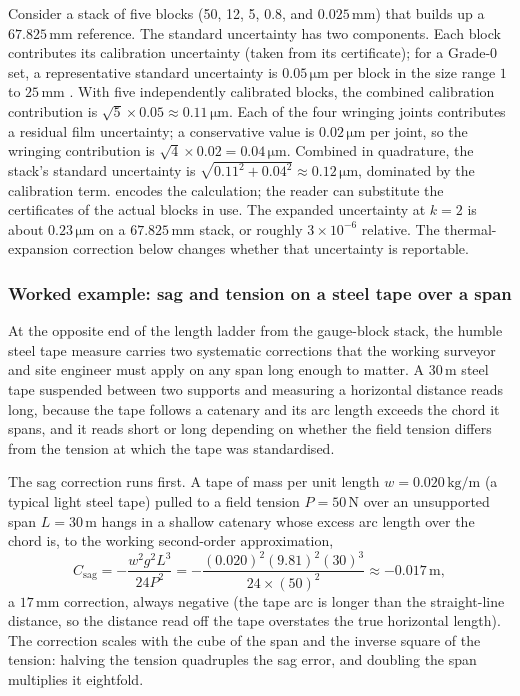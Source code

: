 Consider a stack of five blocks (50, 12, 5, 0.8, and $0.025 \,\si
{\milli\meter}$) that builds up a $67.825 \,\si{\milli\meter}$
reference. The standard uncertainty has two components. Each block
contributes its calibration uncertainty (taken from its certificate);
for a Grade-0 set, a representative standard uncertainty is
$0.05 \,\si{\micro\meter}$ per block in the size range $1$ to
$25 \,\si{\milli\meter}$ \cite{text:doiron-beers-2009}. With five
independently calibrated blocks, the combined calibration
contribution is $\sqrt{5} \times 0.05 \approx 0.11 \,\si{\micro
\meter}$. Each of the four wringing joints contributes a residual
film uncertainty; a conservative value is $0.02 \,\si{\micro\meter}$
per joint, so the wringing contribution is $\sqrt{4} \times 0.02 =
0.04 \,\si{\micro\meter}$. Combined in quadrature, the stack's
standard uncertainty is $\sqrt{0.11^{2} + 0.04^{2}} \approx 0.12 \,
\si{\micro\meter}$, dominated by the calibration term.
encodes the calculation; the reader can substitute the certificates
of the actual blocks in use. The expanded uncertainty at $k = 2$ is
about $0.23 \,\si{\micro\meter}$ on a $67.825 \,\si{\milli\meter}$
stack, or roughly $3 \times 10^{-6}$ relative. The thermal-expansion
correction below changes whether that uncertainty is reportable.

\subsubsection*{Worked example: sag and tension on a steel tape over
a span}

At the opposite end of the length ladder from the gauge-block stack,
the humble steel tape measure carries two systematic corrections that
the working surveyor and site engineer must apply on any span long
enough to matter. A $30 \,\si{\meter}$ steel tape suspended between
two supports and measuring a horizontal distance reads long, because
the tape follows a catenary and its arc length exceeds the chord it
spans, and it reads short or long depending on whether the field
tension differs from the tension at which the tape was standardised.

The sag correction runs first. A tape of mass per unit length
$w = 0.020 \,\si{\kilogram\per\meter}$ (a typical light steel tape)
pulled to a field tension $P = 50 \,\si{\newton}$ over an unsupported
span $L = 30 \,\si{\meter}$ hangs in a shallow catenary whose
excess arc length over the chord is, to the working second-order
approximation,
\[
C_{\mathrm{sag}} = -\frac{w^{2} g^{2} L^{3}}{24 P^{2}}
= -\frac{(0.020)^{2} (9.81)^{2} (30)^{3}}{24 \times (50)^{2}}
\approx -0.017 \,\si{\meter},
\]
a $17 \,\si{\milli\meter}$ correction, always negative (the tape
arc is longer than the straight-line distance, so the distance read
off the tape overstates the true horizontal length). The correction
scales with the cube of the span and the inverse square of the
tension: halving the tension quadruples the sag error, and doubling
the span multiplies it eightfold.

